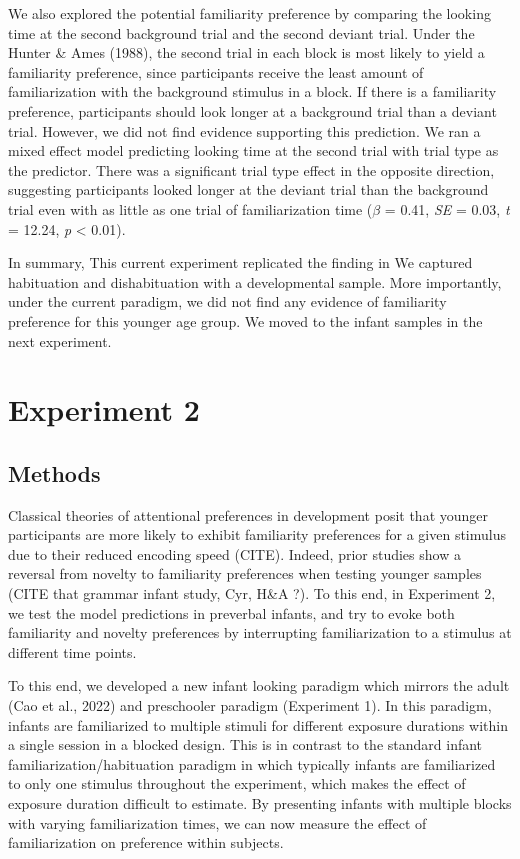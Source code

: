 \documentclass[10pt, letterpaper]{article}
\begin{document}
We also explored the potential familiarity preference by comparing the
looking time at the second background trial and the second deviant
trial. Under the Hunter \& Ames (1988), the second trial in each block
is most likely to yield a familiarity preference, since participants
receive the least amount of familiarization with the background stimulus
in a block. If there is a familiarity preference, participants should
look longer at a background trial than a deviant trial. However, we did
not find evidence supporting this prediction. We ran a mixed effect
model predicting looking time at the second trial with trial type as the
predictor. There was a significant trial type effect in the opposite
direction, suggesting participants looked longer at the deviant trial
than the background trial even with as little as one trial of
familiarization time (\(\beta\) = 0.41, \emph{SE} = 0.03, \emph{t} =
12.24, \emph{p} \textless{} 0.01).

In summary, This current experiment replicated the finding in We
captured habituation and dishabituation with a developmental sample.
More importantly, under the current paradigm, we did not find any
evidence of familiarity preference for this younger age group. We moved
to the infant samples in the next experiment.

\hypertarget{experiment-2}{%
\section{Experiment 2}\label{experiment-2}}

\hypertarget{methods-1}{%
\subsection{Methods}\label{methods-1}}

Classical theories of attentional preferences in development posit that
younger participants are more likely to exhibit familiarity preferences
for a given stimulus due to their reduced encoding speed (CITE). Indeed,
prior studies show a reversal from novelty to familiarity preferences
when testing younger samples (CITE that grammar infant study, Cyr, H\&A
?). To this end, in Experiment 2, we test the model predictions in
preverbal infants, and try to evoke both familiarity and novelty
preferences by interrupting familiarization to a stimulus at different
time points.

To this end, we developed a new infant looking paradigm which mirrors
the adult (Cao et al., 2022) and preschooler paradigm (Experiment 1). In
this paradigm, infants are familiarized to multiple stimuli for
different exposure durations within a single session in a blocked
design. This is in contrast to the standard infant
familiarization/habituation paradigm in which typically infants are
familiarized to only one stimulus throughout the experiment, which makes
the effect of exposure duration difficult to estimate. By presenting
infants with multiple blocks with varying familiarization times, we can
now measure the effect of familiarization on preference within subjects.
\end{document}
